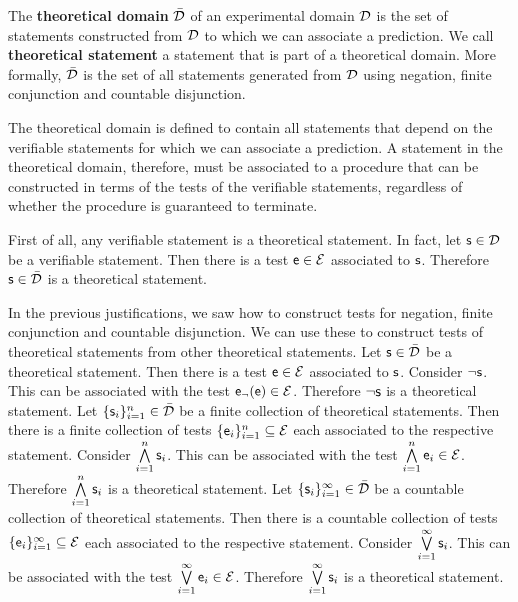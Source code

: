 \documentclass[11pt,letterpaper,fleqn]{memoir} %
\begin{document}
\begin{mathSection}
\begin{defn}\label{1_def_theoretical_domain}
	The \textbf{theoretical domain} $\bar{\mathcal{D}}$ of an experimental domain $\mathcal{D}$ is the set of statements constructed from $\mathcal{D}$ to which we can associate a prediction. We call \textbf{theoretical statement} a statement that is part of a theoretical domain. More formally, $\bar{\mathcal{D}}$ is the set of all statements generated from $\mathcal{D}$ using negation, finite conjunction and countable disjunction.
\end{defn}
\begin{justification}
	The theoretical domain is defined to contain all statements that depend on the verifiable statements for which we can associate a prediction. A statement in the theoretical domain, therefore, must be associated to a procedure that can be constructed in terms of the tests of the verifiable statements, regardless of whether the procedure is guaranteed to terminate.
	
	First of all, any verifiable statement is a theoretical statement. In fact, let $\mathsf{s} \in \mathcal{D}$ be a verifiable statement. Then there is a test $\mathsf{e} \in \mathcal{E}$ associated to $\mathsf{s}$. Therefore $\mathsf{s} \in \bar{\mathcal{D}}$ is a theoretical statement.
	
	In the previous justifications, we saw how to construct tests for negation, finite conjunction and countable disjunction. We can use these to construct tests of theoretical statements from other theoretical statements. Let $\mathsf{s} \in \bar{\mathcal{D}}$ be a theoretical statement. Then there is a test $\mathsf{e} \in \mathcal{E}$ associated to $\mathsf{s}$. Consider $\neg\mathsf{s}$. This can be associated with the test $\mathsf{e}_\neg(\mathsf{e}) \in \mathcal{E}$. Therefore $\neg\mathsf{s}$ is a theoretical statement. Let $\{\mathsf{s}_i\}_{i=1}^{n} \in \bar{\mathcal{D}}$ be a finite collection of theoretical statements. Then there is a finite collection of tests $\{\mathsf{e}_i\}_{i=1}^{n} \subseteq \mathcal{E}$ each associated to the respective statement. Consider $\bigwedge\limits_{i=1}^{n} \mathsf{s}_i$. This can be associated with the test $\bigwedge\limits_{i=1}^{n} \mathsf{e}_i \in \mathcal{E}$. Therefore $\bigwedge\limits_{i=1}^{n} \mathsf{s}_i$ is a theoretical statement. Let $\{\mathsf{s}_i\}_{i=1}^{\infty} \in \bar{\mathcal{D}}$ be a countable collection of theoretical statements. Then there is a countable collection of tests $\{\mathsf{e}_i\}_{i=1}^{\infty} \subseteq \mathcal{E}$ each associated to the respective statement. Consider $\bigvee\limits_{i=1}^{\infty} \mathsf{s}_i$. This can be associated with the test $\bigvee\limits_{i=1}^{\infty} \mathsf{e}_i \in \mathcal{E}$. Therefore $\bigvee\limits_{i=1}^{\infty} \mathsf{s}_i$ is a theoretical statement.
	

\end{justification}
\end{mathSection}
\end{document}
